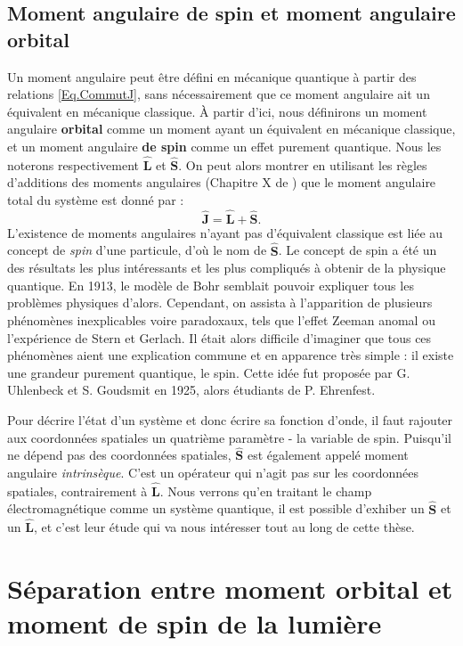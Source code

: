 \subsection{Moment angulaire de spin et moment angulaire orbital}
Un moment angulaire peut être défini en mécanique quantique à partir des relations \ref{Eq.CommutJ}, sans nécessairement que ce moment angulaire ait un équivalent en mécanique classique. \`A partir d'ici, nous définirons un moment angulaire \textbf{orbital} comme un moment ayant un équivalent en mécanique classique, et un moment angulaire \textbf{de spin} comme un effet purement quantique. Nous les noterons respectivement $\bm{\hat{L}}$ et $\bm{\hat{S}}$. On peut alors montrer en utilisant les règles d'additions des moments angulaires (Chapitre X de ) que le moment angulaire total du système est donné par :
\begin{equation}
\bm{\hat{J}}=\bm{\hat{L}}+\bm{\hat{S}}.
\label{Eq.JegalLplusS}
\end{equation}
L'existence de moments angulaires n'ayant pas d'équivalent classique est liée au concept de \textit{spin} d'une particule, d'où le nom de $\bm{\hat{S}}$. Le concept de spin a été un des résultats les plus intéressants et les plus compliqués à obtenir de la physique quantique. En 1913, le modèle de Bohr semblait pouvoir expliquer tous les problèmes physiques d'alors. Cependant, on assista à l'apparition de plusieurs phénomènes inexplicables voire paradoxaux, tels que l'effet Zeeman anomal ou l'expérience de Stern et Gerlach. Il était alors difficile d'imaginer que tous ces phénomènes aient une explication commune et en apparence très simple : il existe une grandeur purement quantique, le spin. Cette idée fut proposée par G. Uhlenbeck et S. Goudsmit en 1925, alors étudiants de P. Ehrenfest. 

Pour décrire l'état d'un système et donc écrire sa fonction d'onde, il faut rajouter aux coordonnées spatiales un quatrième paramètre - la variable de spin. Puisqu'il ne dépend pas des coordonnées spatiales, $\bm{\hat{S}}$ est également appelé moment angulaire \textit{intrinsèque}. C'est un opérateur qui n'agit pas sur les coordonnées spatiales, contrairement à $\bm{\hat{L}}$. 
Nous verrons qu'en traitant le champ électromagnétique comme un système quantique, il est possible d'exhiber un $\bm{\hat{S}}$ et un $\bm{\hat{L}}$, et c'est leur étude qui va nous intéresser tout au long de cette thèse.

\section{Séparation entre moment orbital et moment de spin de la lumière}
